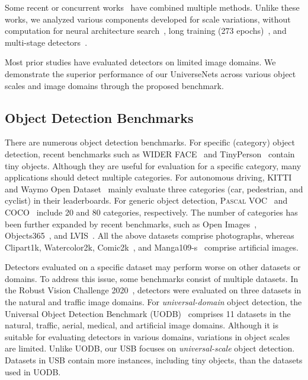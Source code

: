 \documentclass[10pt,twocolumn,letterpaper]{article}
\newcommand{\Univs}{UniverseNets\xspace}
\newcommand{\Pascal}{\textsc{Pascal}\xspace}
\newcommand{\Mangas}{Manga109-s\xspace}
\begin{document}
Some recent or concurrent works~\cite{SM-NAS_AAAI2020, YOLOv4_2020, Waymo2d_1st_2020} have combined multiple methods.
Unlike these works, we analyzed various components developed for scale variations,
without computation for neural architecture search~\cite{SM-NAS_AAAI2020}, long training (273 epochs)~\cite{YOLOv4_2020}, and multi-stage detectors~\cite{Waymo2d_1st_2020}.


Most prior studies have evaluated detectors on limited image domains.
We demonstrate the superior performance of our \Univs
across various object scales and image domains through the proposed benchmark.




\subsection{Object Detection Benchmarks}





There are numerous object detection benchmarks.
For specific (category) object detection,
recent benchmarks such as WIDER FACE~\cite{WIDERFACE_CVPR2016} and TinyPerson~\cite{TinyPerson_WACV2020} contain tiny objects.
Although they are useful for evaluation for a specific category,
many applications should detect multiple categories.
For autonomous driving,
KITTI~\cite{KITTI_CVPR2012} and Waymo Open Dataset~\cite{WaymoOpenDataset_CVPR2020}
mainly evaluate three categories (car, pedestrian, and cyclist) in their leaderboards.
For generic object detection, \Pascal VOC~\cite{PASCALVOC_IJCV2015} and COCO~\cite{COCO_ECCV2014} include 20 and 80 categories, respectively.
The number of categories has been further expanded by recent benchmarks, such as Open Images~\cite{OpenImagesDataset_IJCV2020}, Objects365~\cite{Objects365_ICCV2019}, and LVIS~\cite{LVIS_CVPR2019}.
All the above datasets comprise photographs,
whereas Clipart1k, Watercolor2k, Comic2k~\cite{CrossDomainDetection_Inoue_CVPR2018}, and \Mangas~\cite{Manga109_Matsui_MTAP2017, Manga109_Aizawa_IEEEMM2020}
comprise artificial images.

Detectors evaluated on a specific dataset may perform worse on other datasets or domains.
To address this issue, some benchmarks consist of multiple datasets.
In the Robust Vision Challenge 2020~\cite{RVC2020}, detectors were evaluated on three datasets in the natural and traffic image domains.
For \textit{universal-domain} object detection, the Universal Object Detection Benchmark (UODB)~\cite{UniversalObjectDetection_CVPR2019} comprises 11 datasets in the natural, traffic, aerial, medical, and artificial image domains.
Although it is suitable for evaluating detectors in various domains, variations in object scales are limited.
Unlike UODB, our USB focuses on \textit{universal-scale} object detection.
Datasets in USB contain more instances, including tiny objects, than the datasets used in UODB.
\end{document}
